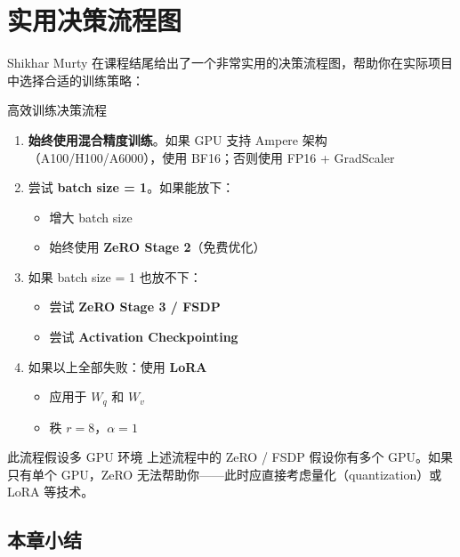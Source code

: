 \documentclass[a4paper]{article}
\begin{document}

\section{实用决策流程图}

Shikhar Murty 在课程结尾给出了一个非常实用的决策流程图，帮助你在实际项目中选择合适的训练策略：




\begin{importantbox}{高效训练决策流程}
\begin{enumerate}
    \item \textbf{始终使用混合精度训练}。如果 GPU 支持 Ampere 架构（A100/H100/A6000），使用 BF16；否则使用 FP16 + GradScaler
    \item 尝试 \textbf{batch size = 1}。如果能放下：
    \begin{itemize}
        \item 增大 batch size
        \item 始终使用 \textbf{ZeRO Stage 2}（免费优化）
    \end{itemize}
    \item 如果 batch size = 1 也放不下：
    \begin{itemize}
        \item 尝试 \textbf{ZeRO Stage 3 / FSDP}
        \item 尝试 \textbf{Activation Checkpointing}
    \end{itemize}
    \item 如果以上全部失败：使用 \textbf{LoRA}
    \begin{itemize}
        \item 应用于 $W_q$ 和 $W_v$
        \item 秩 $r = 8$，$\alpha = 1$
    \end{itemize}
\end{enumerate}
\end{importantbox}

\begin{warningbox}{此流程假设多 GPU 环境}
上述流程中的 ZeRO / FSDP 假设你有多个 GPU。如果只有单个 GPU，ZeRO 无法帮助你——此时应直接考虑量化（quantization）或 LoRA 等技术。
\end{warningbox}

\subsection{本章小结}
\end{document}
